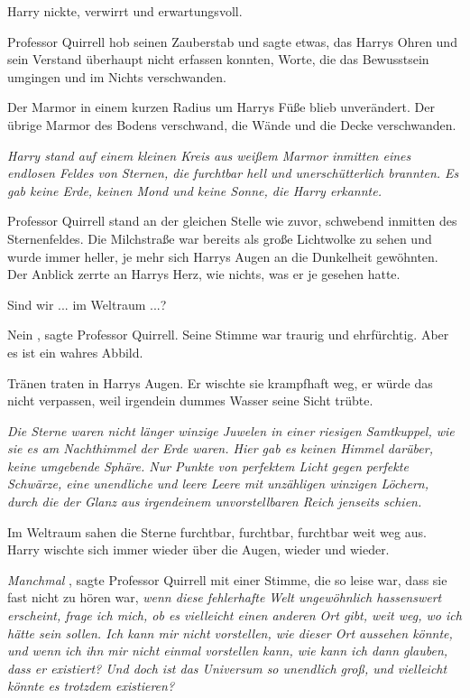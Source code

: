 Harry nickte, verwirrt und erwartungsvoll.

Professor Quirrell hob seinen Zauberstab und sagte etwas, das Harrys Ohren und
sein Verstand überhaupt nicht erfassen konnten, Worte, die das Bewusstsein
umgingen und im Nichts verschwanden.

Der Marmor in einem kurzen Radius um Harrys Füße blieb unverändert. Der übrige
Marmor des Bodens verschwand, die Wände und die Decke verschwanden.

\emph{Harry stand auf einem kleinen Kreis aus weißem Marmor inmitten eines
endlosen Feldes von Sternen, die furchtbar hell und unerschütterlich brannten.
Es gab keine Erde, keinen Mond und keine Sonne, die Harry erkannte. }

Professor Quirrell stand an der gleichen Stelle wie zuvor, schwebend inmitten
des Sternenfeldes. Die Milchstraße war bereits als große Lichtwolke zu sehen und
wurde immer heller, je mehr sich Harrys Augen an die Dunkelheit gewöhnten. Der
Anblick zerrte an Harrys Herz, wie nichts, was er je gesehen hatte.

\glqq Sind wir ... im Weltraum ...?\grqq{}

\glqq Nein\grqq{} , sagte Professor Quirrell. Seine Stimme war traurig und
ehrfürchtig. \glqq Aber es ist ein wahres Abbild.\grqq{}

Tränen traten in Harrys Augen. Er wischte sie krampfhaft weg, er würde das nicht
verpassen, weil irgendein dummes Wasser seine Sicht trübte.

\emph{ Die Sterne waren nicht länger winzige Juwelen in einer riesigen
Samtkuppel, wie sie es am Nachthimmel der Erde waren. Hier gab es keinen Himmel
darüber, keine umgebende Sphäre. Nur Punkte von perfektem Licht gegen perfekte
Schwärze, eine unendliche und leere Leere mit unzähligen winzigen Löchern, durch
die der Glanz aus irgendeinem unvorstellbaren Reich jenseits schien.}

Im Weltraum sahen die Sterne furchtbar, furchtbar, furchtbar weit weg aus. Harry
wischte sich immer wieder über die Augen, wieder und wieder.

\glqq \emph{Manchmal}\grqq{} , sagte Professor Quirrell mit einer Stimme, die so
leise war, dass sie fast nicht zu hören war, \glqq \emph{wenn diese fehlerhafte
Welt ungewöhnlich hassenswert erscheint, frage ich mich, ob es vielleicht einen
anderen Ort gibt, weit weg, wo ich }\emph{hätte sein sollen. Ich kann mir nicht
vorstellen, wie dieser Ort aussehen könnte, und wenn ich ihn mir nicht einmal
vorstellen kann, wie kann ich dann glauben, dass er existiert? Und doch ist das
Universum so unendlich groß, und vielleicht könnte es trotzdem existieren? }

